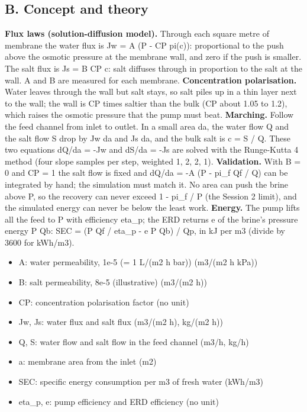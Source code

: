 \documentclass[11pt,a4paper]{article}
\begin{document}
\subsection*{B. Concept and theory}
\textbf{Flux laws (solution-diffusion model).} Through each square metre of membrane the water flux is Jw = A (P - CP pi(c)): proportional to the push above the osmotic pressure at the membrane wall, and zero if the push is smaller. The salt flux is Js = B CP c: salt diffuses through in proportion to the salt at the wall. A and B are measured for each membrane. \textbf{Concentration polarisation.} Water leaves through the wall but salt stays, so salt piles up in a thin layer next to the wall; the wall is CP times saltier than the bulk (CP about 1.05 to 1.2), which raises the osmotic pressure that the pump must beat. \textbf{Marching.} Follow the feed channel from inlet to outlet. In a small area da, the water flow Q and the salt flow S drop by Jw da and Js da, and the bulk salt is c = S / Q. These two equations dQ/da = -Jw and dS/da = -Js are solved with the Runge-Kutta 4 method (four slope samples per step, weighted 1, 2, 2, 1). \textbf{Validation.} With B = 0 and CP = 1 the salt flow is fixed and dQ/da = -A (P - pi\_f Qf / Q) can be integrated by hand; the simulation must match it. No area can push the brine above P, so the recovery can never exceed 1 - pi\_f / P (the Session 2 limit), and the simulated energy can never be below the least work. \textbf{Energy.} The pump lifts all the feed to P with efficiency eta\_p; the ERD returns e of the brine's pressure energy P Qb: SEC = (P Qf / eta\_p - e P Qb) / Qp, in kJ per m3 (divide by 3600 for kWh/m3).

\begin{itemize}[nosep]
\item A: water permeability, 1e-5 (= 1 L/(m2 h bar)) (m3/(m2 h kPa))
\item B: salt permeability, 8e-5 (illustrative) (m3/(m2 h))
\item CP: concentration polarisation factor (no unit)
\item Jw, Js: water flux and salt flux (m3/(m2 h), kg/(m2 h))
\item Q, S: water flow and salt flow in the feed channel (m3/h, kg/h)
\item a: membrane area from the inlet (m2)
\item SEC: specific energy consumption per m3 of fresh water (kWh/m3)
\item eta\_p, e: pump efficiency and ERD efficiency (no unit)
\end{itemize}
\end{document}

